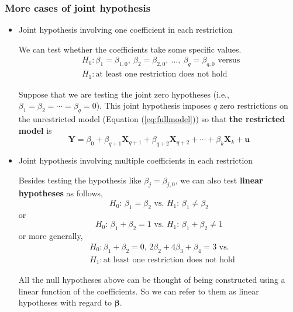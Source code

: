\documentclass[a4paper,11pt]{article}
\begin{document}
\subsubsection*{More cases of joint hypothesis}
\label{sec:orgac13be8}

\begin{itemize}
\item Joint hypothesis involving one coefficient in each restriction
\label{sec:org0c0123e}

We can test whether the coefficients take some specific values.
\begin{align*}
&H_0: \beta_1 = \beta_{1,0},\ \beta_2 = \beta_{2,0},\ \ldots,\ \beta_q = \beta_{q,0} \text{ versus } \\
&H_1: \text{at least one restriction does not hold}
\end{align*}

Suppose that we are testing the joint zero hypotheses (i.e., \(\beta_1
= \beta_2 = \cdots = \beta_q = 0\)). This joint hypothesis imposes \(q\)
zero restrictions on the unrestricted model (Equation
(\ref{eq:fullmodel})) so that \textbf{the restricted model} is
\begin{equation}
\label{eq:restmodel-2}
\mathbf{Y} = \beta_0 + \beta_{q+1} \mathbf{X}_{q+1} + \beta_{q+2} \mathbf{X}_{q+2} + \cdots + \beta_k \mathbf{X}_k + \mathbf{u}
\end{equation}

\item Joint hypothesis involving multiple coefficients in each restriction
\label{sec:org9b2ad15}

Besides testing the hypothesis like \(\beta_j = \beta_{j,0}\), we can
also test \textbf{linear hypotheses} as follows,
\begin{equation*}
H_0:\, \beta_1 = \beta_2 \text{ vs. } H_1:\, \beta_1 \neq \beta_2
\end{equation*}
or
\begin{equation*}
H_0:\, \beta_1 + \beta_2 = 1 \text{ vs. } H_1:\, \beta_1 + \beta_2 \neq 1
\end{equation*}
or more generally,
\begin{align*}
&H_0: \beta_1 + \beta_2 = 0,\, 2\beta_2 + 4\beta_3 + \beta_4 = 3 \text{ vs. } \\
&H_1: \text{at least one restriction does not hold}
\end{align*}

All the null hypotheses above can be thought of being constructed
using a linear function of the coefficients. So we can refer to them
as linear hypotheses with regard to \(\boldsymbol{\beta}\).
\end{itemize}
\end{document}
